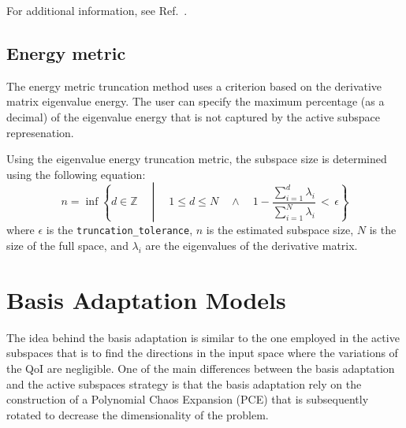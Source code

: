 For additional information, see Ref.~\cite{bing-li}.

\subsection{Energy metric}\label{SubSec:energy}
The energy metric truncation method uses a criterion based on the derivative matrix
eigenvalue energy. The user can specify the maximum percentage (as a decimal) of
the eigenvalue energy that is not captured by the active subspace represenation.

Using the eigenvalue energy truncation metric, the subspace size is determined using the following equation:
$$n = \inf \left\lbrace d \in \mathbb{Z} \quad\middle|\quad 1 \le d \le N \quad \wedge\quad 1 - \frac{\sum_{i = 1}^{d} \lambda_i}{\sum_{i = 1}^{N} \lambda_i} \,<\, \epsilon \right\rbrace $$
where $\epsilon$ is the \texttt{truncation\_tolerance}, $n$ is the estimated subspace size, $N$ is the size of the full space, and $\lambda_i$ are the eigenvalues of the derivative matrix.



\section{Basis Adaptation Models}\label{Chap:BasAdapt}
The idea behind the basis adaptation is similar to the one employed in the active subspaces that is to find the directions
in the input space where the variations of the QoI are negligible. One of the main differences between the basis adaptation and
the active subspaces strategy is that the basis adaptation rely on the construction of a Polynomial Chaos Expansion (PCE) that is 
subsequently rotated to decrease the dimensionality of the problem.
